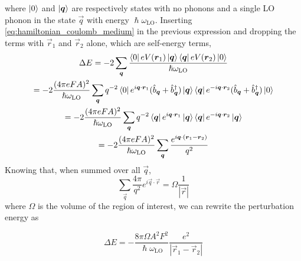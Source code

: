 where $\ket{0}$ and $\ket{\mathbf{\boldsymbol{q}}}$ are respectively states with no phonons and a single LO phonon in the state $\vec{q}$ with energy $\hslash\omega_\text{LO}$. Inserting \cref{eq:hamiltonian_coulomb_medium} in the previous expression and dropping the terms with $\vec{r}_1$ and $\vec{r}_2$ alone, which are self-energy terms,
\begin{multline}
    \Delta E = -2\sum_{\mathbf{\boldsymbol{q}}} \frac{\bra{0}eV(\mathbf{\boldsymbol{r}}_1)\ket{\mathbf{\boldsymbol{q}}}\bra{\mathbf{\boldsymbol{q}}}eV(\mathbf{\boldsymbol{r}}_2)\ket{0}}{\hslash\omega_\text{LO}}
    \\ = -2 \frac{(4\pi eFA)^2}{\hslash \omega_\text{LO}} \sum_{\mathbf{\boldsymbol{q}}} q^{-2} \bra{0}e^{i\mathbf{\boldsymbol{q}}\cdot\mathbf{\boldsymbol{r}}_1}(\hat{b}_{\mathbf{\boldsymbol{q}}} + \hat{b}^\dagger_{\mathbf{\boldsymbol{q}}})\ket{\mathbf{\boldsymbol{q}}}\bra{\mathbf{\boldsymbol{q}}}e^{-i\mathbf{\boldsymbol{q}}\cdot\mathbf{\boldsymbol{r}}_2}(\hat{b}_{\mathbf{\boldsymbol{q}}} + \hat{b}^\dagger_{\mathbf{\boldsymbol{q}}})\ket{0}
    \\ = - 2 \frac{(4\pi eFA)^2}{\hslash \omega_\text{LO}} \sum_{\mathbf{\boldsymbol{q}}} q^{-2} \bra{\mathbf{\boldsymbol{q}}}e^{i\mathbf{\boldsymbol{q}}\cdot\mathbf{\boldsymbol{r}}_1}\ket{\mathbf{\boldsymbol{q}}}\bra{\mathbf{\boldsymbol{q}}}e^{-i\mathbf{\boldsymbol{q}}\cdot\mathbf{\boldsymbol{r}}_2}\ket{\mathbf{\boldsymbol{q}}}
    \\ = - 2 \frac{(4\pi eFA)^2}{\hslash \omega_\text{LO}} \sum_{\mathbf{\boldsymbol{q}}}\frac{e^{i\mathbf{\boldsymbol{q}}\cdot(\mathbf{\boldsymbol{r}}_1 - \mathbf{\boldsymbol{r}}_2)}}{q^2}
\end{multline}
Knowing that, when summed over all $\vec{q}$,
\begin{equation}
    \sum_\vec{q} \frac{4\pi}{q^2} e^{i\vec{q}\cdot \vec{r}} = \Omega \frac{1}{|\vec{r}|}
\end{equation}
where $\Omega$ is the volume of the region of interest, we can rewrite the perturbation energy as

\begin{equation}
    \Delta E = - \frac{8\pi \Omega A^2 F^2}{\hslash \omega_\text{LO}} \frac{e^2}{|\vec{r}_1 - \vec{r}_2|}
\end{equation}


